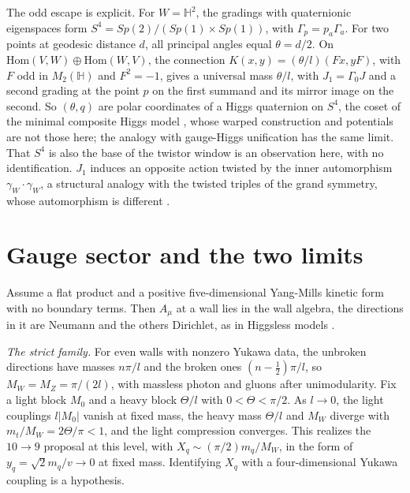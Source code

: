 \documentclass[aps,prd,reprint,onecolumn,nofootinbib,amsmath,amssymb,floatfix]{revtex4-2}
\theoremstyle{plain}
\renewcommand{\H}{\mathbb H}
\begin{document}
The odd escape is explicit. For $W=\H^2$, the gradings with quaternionic eigenspaces form $S^4=Sp(2)/(Sp(1)\times Sp(1))$, with $\Gamma_p=p_a\Gamma_a$. For two points at geodesic distance $d$, all principal angles equal $\theta=d/2$. On $\mathrm{Hom}(V,W)\oplus\mathrm{Hom}(W,V)$, the connection $K(x,y)=(\theta/l)(Fx,yF)$, with $F$ odd in $M_2(\H)$ and $F^2=-1$, gives a universal mass $\theta/l$, with $J_1=\Gamma_0J$ and a second grading at the point $p$ on the first summand and its mirror image on the second. So $(\theta,q)$ are polar coordinates of a Higgs quaternion on $S^4$, the coset of the minimal composite Higgs model \cite{ACP2005}, whose warped construction and potentials are not those here; the analogy with gauge-Higgs unification \cite{Hosotani1983} has the same limit. That $S^4$ is also the base of the twistor window is an observation here, with no identification. $J_1$ induces an opposite action twisted by the inner automorphism $\gamma_W\cdot\gamma_W$, a structural analogy with the twisted triples of the grand symmetry, whose automorphism is different \cite{DLM2014}.

\section{Gauge sector and the two limits}

Assume a flat product and a positive five-dimensional Yang-Mills kinetic form with no boundary terms. Then $A_\mu$ at a wall lies in the wall algebra, the directions in it are Neumann and the others Dirichlet, as in Higgsless models \cite{Csaki2003}.

\emph{The strict family.} For even walls with nonzero Yukawa data, the unbroken directions have masses $n\pi/l$ and the broken ones $(n-\tfrac12)\pi/l$, so $M_W=M_Z=\pi/(2l)$, with massless photon and gluons after unimodularity. Fix a light block $M_0$ and a heavy block $\Theta/l$ with $0<\Theta<\pi/2$. As $l\to0$, the light couplings $l|M_0|$ vanish at fixed mass, the heavy mass $\Theta/l$ and $M_W$ diverge with $m_t/M_W=2\Theta/\pi<1$, and the light compression converges. This realizes the $10\to9$ proposal at this level, with $X_q\sim(\pi/2)m_q/M_W$, in the form of $y_q=\sqrt2m_q/v\to0$ at fixed mass. Identifying $X_q$ with a four-dimensional Yukawa coupling is a hypothesis.
\end{document}
